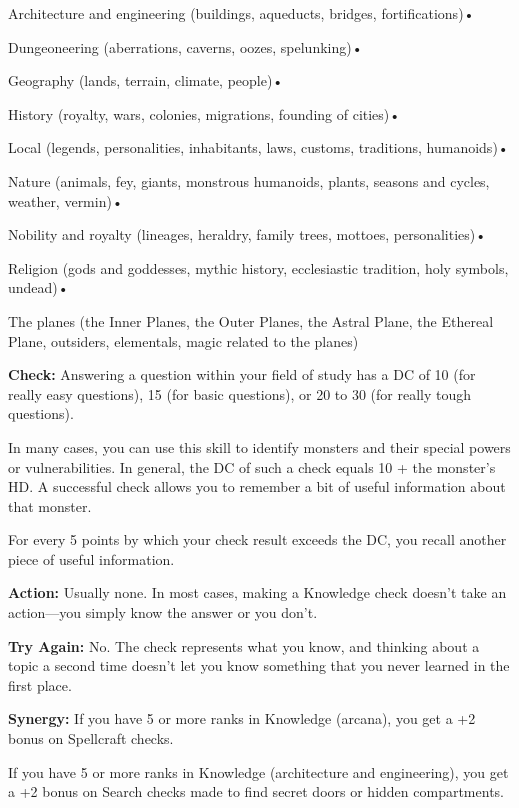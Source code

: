 \documentclass{article}
\begin{document}
Architecture and engineering (buildings, aqueducts, bridges, fortifications)• 

\parindent=7pt
Dungeoneering (aberrations, caverns, oozes, spelunking)• 

\parindent=3pt
Geography (lands, terrain, climate, people)• 

History (royalty, wars, colonies, migrations, founding of cities)• 

\parindent=7pt
Local (legends, personalities, inhabitants, laws, customs, traditions, humanoids)• 

\parindent=3pt
Nature (animals, fey, giants, monstrous humanoids, plants, seasons and cycles, 
weather, vermin)• 

Nobility and royalty (lineages, heraldry, family trees, mottoes, personalities)• 

\parindent=7pt
Religion (gods and goddesses, mythic history, ecclesiastic tradition, holy symbols, 
undead)• 

\parindent=3pt
The planes (the Inner Planes, the Outer Planes, the Astral Plane, the Ethereal 
Plane, outsiders, elementals, magic related to the planes)

\parindent=0pt
\textbf{Check:} Answering a question within your field of study has a DC of 10 
(for really easy questions), 15 (for basic questions), or 20 to 30 (for really 
tough questions).

In many cases, you can use this skill to identify monsters and their special powers 
or vulnerabilities. In general, the DC of such a check equals 10 + the monster's 
HD. A successful check allows you to remember a bit of useful information about 
that monster.

For every 5 points by which your check result exceeds the DC, you recall another 
piece of useful information.

\textbf{Action:} Usually none. In most cases, making a Knowledge check doesn't 
take an action---you simply know the answer or you don't.

\textbf{Try Again:} No. The check represents what you know, and thinking about 
a topic a second time doesn't let you know something that you never learned in 
the first place.

\textbf{Synergy:} If you have 5 or more ranks in Knowledge (arcana), you get a 
+2 bonus on Spellcraft checks.

If you have 5 or more ranks in Knowledge (architecture and engineering), you get 
a +2 bonus on Search checks made to find secret doors or hidden compartments.
\end{document}
